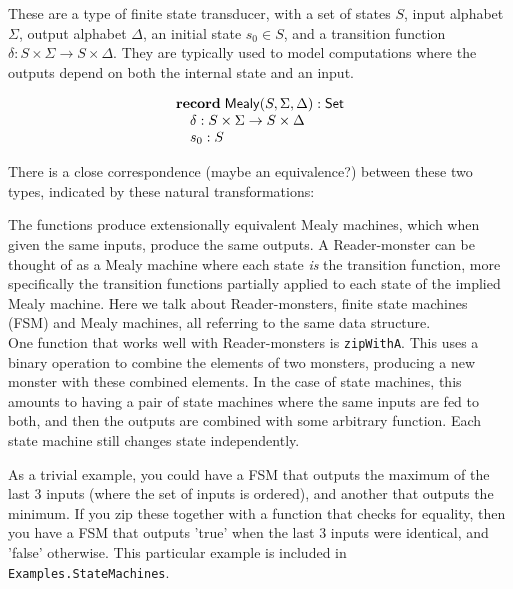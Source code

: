 These are a type of finite state transducer, with a set of states $S$, input alphabet $\Sigma$, output alphabet $\Delta$, an initial state $s_0 \in S$, and a transition function $\delta : S \times \Sigma \to S \times \Delta$. They are typically used to model computations where the outputs depend on both the internal state and an input.

$$
\begin{array}[t]{l}
\mathbf{record}\;
\mathsf{Mealy}(S,\Sigma,\Delta):\mathsf{Set}\\
\quad \delta : S \times \Sigma \to S \times \Delta \\
\quad s_0 : S
\end{array}
$$

There is a close correspondence (maybe an equivalence?) between these two types, indicated by these natural transformations:

The functions produce extensionally equivalent Mealy machines, which when given the same inputs, produce the same outputs. A Reader-monster can be thought of as a Mealy machine where each state \emph{is} the transition function, more specifically the transition functions partially applied to each state of the implied Mealy machine. Here we talk about Reader-monsters, finite state machines (FSM) and Mealy machines, all referring to the same data structure. \\

One function that works well with Reader-monsters is \verb+zipWithA+. This uses a binary operation to combine the elements of two monsters, producing a new monster with these combined elements. In the case of state machines, this amounts to having a pair of state machines where the same inputs are fed to both, and then the outputs are combined with some arbitrary function. Each state machine still changes state independently.

As a trivial example, you could have a FSM that outputs the maximum of the last $3$ inputs (where the set of inputs is ordered), and another that outputs the minimum. If you zip these together with a function that checks for equality, then you have a FSM that outputs 'true' when the last $3$ inputs were identical, and 'false' otherwise. This particular example is included in \verb+Examples.StateMachines+.

